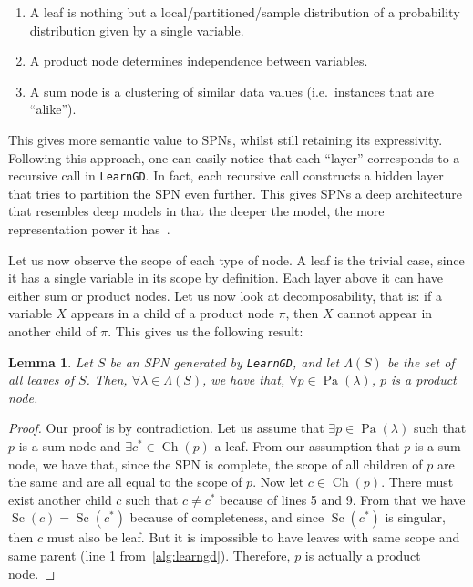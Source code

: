 \documentclass{amsart}
\DeclareMathOperator*{\Ch}{\text{Ch}}
\DeclareMathOperator*{\Pa}{\text{Pa}}
\DeclareMathOperator*{\Sc}{\text{Sc}}
\theoremstyle{plain}
\newcounter{dummy-def}\numberwithin{dummy-def}{section}
\newcounter{dummy-thm}\numberwithin{dummy-thm}{section}
\newcounter{dummy-prop}\numberwithin{dummy-prop}{section}
\newcounter{dummy-corollary}\numberwithin{dummy-corollary}{section}
\newcounter{dummy-lemma}\numberwithin{dummy-lemma}{section}
\newtheorem{lemma}[dummy-lemma]{Lemma}
\newcounter{dummy-ex}\numberwithin{dummy-ex}{section}
\newcounter{dummy-eg}\numberwithin{dummy-eg}{section}
\numberwithin{equation}{section}
\newcommand{\code}[1]{\lstinline[mathescape=true]{#1}}
\begin{document}
\begin{enumerate}
  \item A leaf is nothing but a local/partitioned/sample distribution of a probability distribution
    given by a single variable.
  \item A product node determines independence between variables.
  \item A sum node is a clustering of similar data values (i.e.\ instances that are ``alike'').
\end{enumerate}

This gives more semantic value to SPNs, whilst still retaining its expressivity. Following this
approach, one can easily notice that each ``layer'' corresponds to a recursive call in
\code{LearnGD}. In fact, each recursive call constructs a hidden layer that tries to partition the
SPN even further. This gives SPNs a deep architecture that resembles deep models in that the deeper
the model, the more representation power it has~\cite{shallow-vs-deep}.

Let us now observe the scope of each type of node. A leaf is the trivial case, since it has a
single variable in its scope by definition. Each layer above it can have either sum or product
nodes. Let us now look at decomposability, that is: if a variable $X$ appears in a child of a
product node $\pi$, then $X$ cannot appear in another child of $\pi$. This gives us the following
result:

\begin{lemma}\label{lemma-parents}
  Let $S$ be an SPN generated by \code{LearnGD}, and let $\Lambda(S)$ be the set of all leaves of
  $S$. Then, $\forall \lambda \in \Lambda(S)$, we have that, $\forall p \in \Pa(\lambda)$, $p$ is a
  product node.
\end{lemma}
\begin{proof}
  Our proof is by contradiction. Let us assume that $\exists p \in \Pa(\lambda)$ such that $p$ is
  a sum node and $\exists c^* \in \Ch(p)$ a leaf. From our assumption that $p$ is a sum node, we
  have that, since the SPN is complete, the scope of all children of $p$ are the same and are all
  equal to the scope of $p$. Now let $c \in \Ch(p)$. There must exist another child $c$ such that
  $c\neq c^*$ because of lines 5 and 9. From that we have $\Sc(c)=\Sc(c^*)$ because of
  completeness, and since $\Sc(c^*)$ is singular, then $c$ must also be leaf. But it is impossible
  to have leaves with same scope and same parent (line 1 from~\autoref{alg:learngd}). Therefore,
  $p$ is actually a product node.
\end{proof}
\end{document}
